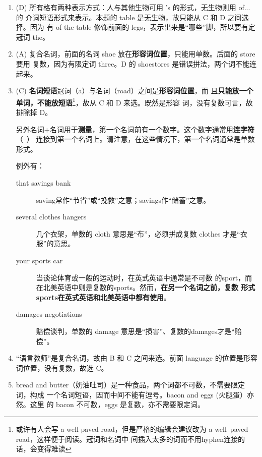\begin{enumerate}


\item (D) 所有格有两种表示方式：人与其他生物可用 's 的形式，无生物则用 of... 的
  介词短语形式来表示。本题的 table 是无生物，故只能从 C 和 D 之间选择。因为
  有 of the table 修饰前面的 legs，表示出来是“哪些”脚，所以要有定冠词 the。

\item (A) 复合名词，前面的名词 shoe 放在\textbf{形容词位置}，只能用单数。后面的 store 要用
  复数，因为有限定词 three。D 的 shoestores 是错误拼法，两个词不能连起来。

\item (C) \textbf{名词短语}冠词（a）与名词（road）之间是\textbf{形容词位置}，而
  且\textbf{只能放一个单词，不能放短语}\footnote{或许有人会写 a well paved
    road，但是严格的编辑会建议改为 a well--paved road，这样便于阅读。冠词和名词中
    间插入太多的词而不用hyphen连接的话，会变得难读}，故从 C 和 D 来选。既然是形容
  词，没有复数可言，故排除掉 D。

  另外名词+名词用于\textbf{测量}，第一个名词前有一个数字。这个数字通常用\textbf{连字符}（--）
  连接到第一个名词上。请注意，在这些情况下，第一个名词通常是单数形式。

  例外有：
  \begin{description}
  \item[that savings bank] saving常作“节省”或“挽救”之意；savings作“储蓄”之意。

  \item[several clothes hangers] 几个衣架，单数的 cloth 意思是“布”，必须拼成复数 clothes 才是“衣服”的意思。

  \item[your sports car] 当谈论体育或一般的运动时，在英式英语中通常是不可数
    的sport，而在北美英语中则是复数的sports。然而，\textbf{在另一个名词之前，复数
      形式sports在英式英语和北美英语中都有使用}。

  \item[damages negotiations ]  赔偿谈判，单数的 damage 意思是“损害”、复数的damages才是“赔偿”。
  \end{description}

\item “语言教师”是复合名词，故由 B 和
  C 之间来选。前面 language 的位置是形容词位置，没有复数，故选 C。

\item bread and butter（奶油吐司）是一种食品，两个词都不可数，不需要限定词，构成
  一个名词短语，因而中间不能有逗号。bacon and eggs (火腿蛋）亦然。这里
  的 bacon 不可数，eggs 是复数，亦不需要限定词。


\end{enumerate}
